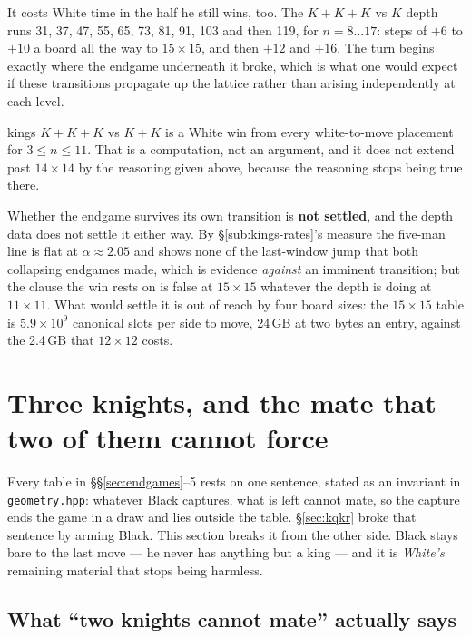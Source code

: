 \documentclass[11pt]{article}
\begin{document}
It costs White time in the half he still wins, too. The
$K\!+\!K\!+\!K$ vs $K$ depth runs 31, 37, 47, 55, 65, 73, 81, 91, 103 and
then 119, for $n = 8 \ldots 17$: steps of $+6$ to $+10$ a board all the way to
$15\times15$,
and then $+12$ and $+16$. The turn begins exactly where the endgame underneath
it broke, which is what one would expect if these transitions propagate up the
lattice rather than arising independently at each level.

\begin{result}[title={What is settled here, and what is not}]{kings}
$K\!+\!K\!+\!K$ vs $K\!+\!K$ is a White win from every white-to-move placement
for $3 \le n \le 11$. That is a computation, not an argument, and it does not
extend past $14\times14$ by the reasoning given above, because the reasoning
stops being true there.

Whether the endgame survives its own transition is \textbf{not settled}, and
the depth data does not settle it either way. By \S\ref{sub:kings-rates}'s
measure the five-man line is flat at $\alpha \approx 2.05$ and shows none of
the last-window jump that both collapsing endgames made, which is evidence
\emph{against} an imminent transition; but the clause the win rests on is
false at $15\times15$ whatever the depth is doing at $11\times11$. What would
settle it is out of reach by four board sizes: the $15\times15$ table is
$5.9\times10^{9}$ canonical slots per side to move, 24\,GB at two bytes an
entry, against the 2.4\,GB that $12\times12$ costs.
\end{result}

\section{Three knights, and the mate that two of them cannot force}\label{sec:knights}

Every table in \S\S\ref{sec:endgames}--5 rests on one sentence, stated as an invariant in
\texttt{geometry.hpp}: whatever Black captures, what is left cannot mate, so
the capture ends the game in a draw and lies outside the table. \S\ref{sec:kqkr} broke that
sentence by arming Black. This section breaks it from the other side. Black
stays bare to the last move --- he never has anything but a king --- and it is
\emph{White's} remaining material that stops being harmless.

\subsection{What ``two knights cannot mate'' actually says}\label{sub:kn-claim}
\end{document}
